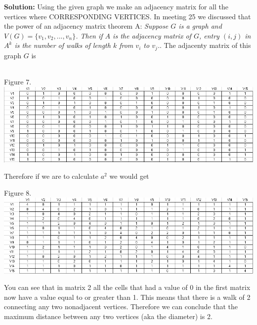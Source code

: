 \documentclass[10pt,a4paper]{report}
\begin{document}
	\noindent\textbf{Solution: }Using the given graph we make an adjacency matrix for all the vertices where CORRESPONDING VERTICES.  In meeting 25 we discussed that the power of an adjacency matrix theorem A: \emph{Suppose $G$ is a graph and $V(G) = \{v_{1}, v_{2}, ..., v_{n}\}$.  Then if $A$ is the adjacency matrix of $G$, entry $(i, j)$ in $A^{k}$ is the number of walks of length $k$ from $v_{i}$ to $v_{j}$.}.  The adjacenty matrix of this graph $G$ is  \\\\
	\begin{center}
		Figure 7.\\
		\includegraphics[scale=.64]{Math3310_Prob6.PNG} \\
	\end{center}
	
	\noindent Therefore if we are to calculate $a^{2}$ we would get\\
	
	\begin{center}
		Figure 8.\\
		\noindent\includegraphics[scale=.64]{Math3310_Prob6-1.PNG}\\
	\end{center}
	
	\noindent You can see that in matrix 2 all the cells that had a value of 0 in the first matrix now have a value equal to or greater than 1.  This means that there is a walk of 2 connecting any two nonadjacent vertices.  Therefore we can conclude that the maximum distance between any two vertices (aka the diameter) is 2.
	
\end{document}
